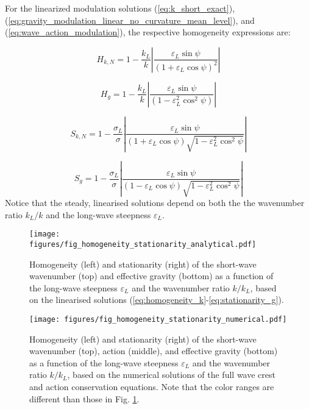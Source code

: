 \documentclass[lineno]{jfm}
\begin{document}
For the linearized modulation solutions (\ref{eq:k_short_exact}),
(\ref{eq:gravity_modulation_linear_no_curvature_mean_level}), and
(\ref{eq:wave_action_modulation}), the respective homogeneity expressions are:

\begin{equation}
  H_{k,N} = 1 - \frac{k_L}{k} \left| \frac{\varepsilon_L \sin{\psi}}{\left(1 + \varepsilon_L \cos{\psi}\right)^2} \right|
  \label{eq:homogeneity_k}
\end{equation}

\begin{equation}
  H_{g} = 1 - \frac{k_L}{k} \left| \frac{\varepsilon_L \sin{\psi}}{\left(1 - \varepsilon_L^2 \cos^2{\psi}\right)} \right|
  \label{eq:homogeneity_g}
\end{equation}

\begin{equation}
  S_{k,N} = 1 - \frac{\sigma_L}{\sigma} \left| \frac{\varepsilon_L \sin{\psi}}{\left(1 + \varepsilon_L \cos{\psi}\right) \sqrt{1 - \varepsilon_L^2 \cos^2{\psi}}} \right|
  \label{eq:stationarity_k}
\end{equation}

\begin{equation}
  S_{g} = 1 - \frac{\sigma_L}{\sigma} \left| \frac{\varepsilon_L \sin{\psi}}{\left(1 - \varepsilon_L \cos{\psi}\right) \sqrt{1 - \varepsilon_L^2 \cos^2{\psi}}} \right|
  \label{eq:stationarity_g}
\end{equation}
Notice that the steady, linearised solutions depend on both the the wavenumber
ratio $k_L/k$ and the long-wave steepness $\varepsilon_L$.

\begin{figure}
\centering
\texttt{[image: figures/fig\_homogeneity\_stationarity\_analytical.pdf]}
\caption{
Homogeneity (left) and stationarity (right) of the short-wave wavenumber (top)
and effective gravity (bottom) as a function of the long-wave steepness
$\varepsilon_L$ and the wavenumber ratio $k/k_L$, based on the linearised
solutions (\ref{eq:homogeneity_k}-\ref{eq:stationarity_g}).
}
\label{fig:homogeneity_stationarity_analytical}
\end{figure}

\begin{figure}
\centering
\texttt{[image: figures/fig\_homogeneity\_stationarity\_numerical.pdf]}
\caption{
Homogeneity (left) and stationarity (right) of the short-wave wavenumber (top),
action (middle), and effective gravity (bottom) as a function of the long-wave
steepness $\varepsilon_L$ and the wavenumber ratio $k/k_L$, based on the
numerical solutions of the full wave crest and action conservation equations.
Note that the color ranges are different than those in Fig. \ref{fig:homogeneity_stationarity_analytical}.
}
\label{fig:homogeneity_stationarity_numerical}
\end{figure}
\end{document}
